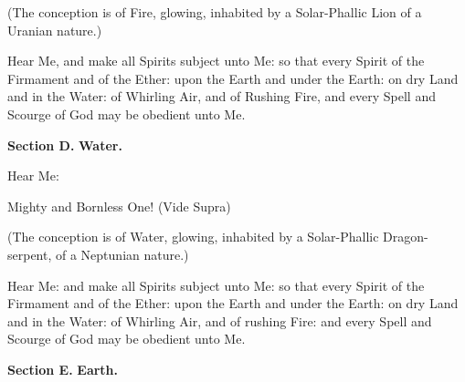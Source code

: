 (The conception is of Fire, glowing, inhabited by a Solar-Phallic Lion of a Uranian nature.)

Hear Me, and make all Spirits subject unto Me: so that every Spirit of the Firmament and of the Ether: upon the Earth and under the Earth: on dry Land and in the Water:  of Whirling Air, and of Rushing Fire, and every Spell and Scourge of God may be obedient unto Me.

\textbf{Section D.} \hfill \textbf{Water.}

Hear Me: \textemdash{}











Mighty and Bornless One! (Vide Supra)

(The conception is of Water, glowing, inhabited by a Solar-Phallic Dragon-serpent, of a Neptunian nature.)

Hear Me: and make all Spirits subject unto Me: so that every Spirit of the Firmament and of the Ether: upon the Earth and under the Earth: on dry Land and in the Water: of Whirling Air, and of rushing Fire: and every Spell and Scourge of God may be obedient unto Me.

\textbf{Section E.} \hfill \textbf{Earth.}

